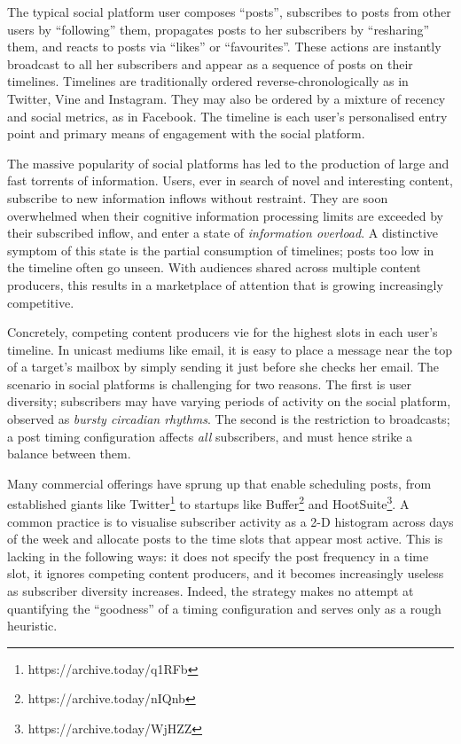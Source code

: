 \documentclass[onesided,asymmetric]{tufte-book}
\begin{document}
The typical social platform user composes ``posts'', subscribes to posts from other users by ``following'' them, propagates posts to her subscribers by ``resharing'' them, and reacts to posts via ``likes'' or ``favourites''. These actions are instantly broadcast to all her subscribers and appear as a sequence of posts on their timelines. Timelines are traditionally ordered reverse-chronologically as in Twitter, Vine and Instagram. They may also be ordered by a mixture of recency and social metrics, as in Facebook. The timeline is each user's personalised entry point and primary means of engagement with the social platform.

The massive popularity of social platforms has led to the production of large and fast torrents of information. Users, ever in search of novel and interesting content, subscribe to new information inflows without restraint\cite{gomez2014quantifying}. They are soon overwhelmed when their cognitive information processing limits are exceeded by their subscribed inflow, and enter a state of \textit{information overload}. A distinctive symptom of this state is the partial consumption of timelines; posts too low in the timeline often go unseen. With audiences shared across multiple content producers, this results in a marketplace of attention that is growing increasingly competitive.

Concretely, competing content producers vie for the highest slots in each user's timeline. In unicast mediums like email, it is easy to place a message near the top of a target's mailbox by simply sending it just before she checks her email. The scenario in social platforms is challenging for two reasons. The first is user diversity; subscribers may have varying periods of activity on the social platform, observed as \textit{bursty circadian rhythms}. The second is the restriction to broadcasts; a post timing configuration affects \textit{all} subscribers, and must hence strike a balance between them.

Many commercial offerings have sprung up that enable scheduling posts, from established giants like Twitter\footnote{https://archive.today/q1RFb} to startups like Buffer\footnote{https://archive.today/nIQnb} and HootSuite\footnote{https://archive.today/WjHZZ}. A common practice is to visualise subscriber activity as a 2-D histogram across days of the week and allocate posts to the time slots that appear most active. This is lacking in the following ways: it does not specify the post frequency in a time slot, it ignores competing content producers, and it becomes increasingly useless as subscriber diversity increases. Indeed, the strategy makes no attempt at quantifying the ``goodness'' of a timing configuration and serves only as a rough heuristic.
\end{document}
